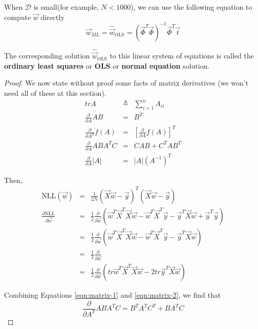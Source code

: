 When $\mathcal{D}$ is small(for example, $N < 1000$), we can use the following equation to compute $\vec{w}$ directly
\begin{equation}
\vec{w}_{ML}=\hat{\vec{w}}_{\mathrm{OLS}}=(\vec{\Phi}^T\vec{\Phi})^{-1}\vec{\Phi}^T\vec{t}
\end{equation}

The corresponding solution $\hat{\vec{w}}_{\mathrm{OLS}}$ to this linear system of equations is called the \textbf{ordinary least squares} or \textbf{OLS} or \textbf{normal equation} solution.

\begin{proof}
We now state without proof some facts of matrix derivatives (we won’t need all of these at this section).
\begin{eqnarray}
trA &\triangleq& \sum\limits_{i=1}^n A_{ii} \nonumber \\
\frac{\partial}{\partial A}AB &=& B^T \\
\frac{\partial}{\partial A^T}f(A) &=& \left[\frac{\partial}{\partial A}f(A)\right]^T \label{eqn:matrix-1} \\
\frac{\partial}{\partial A}ABA^TC &=& CAB+C^TAB^T \label{eqn:matrix-2} \\
\frac{\partial}{\partial A}|A| &=& |A|(A^{-1})^T
\end{eqnarray}

Then,
\begin{eqnarray*}
\text{NLL}(\vec{w}) &=& \frac{1}{2N}(\vec{X}\vec{w}-\vec{y})^T(\vec{X}\vec{w}-\vec{y}) \\
\frac{\partial \text{NLL}}{\partial\vec{w}} 
&=& \frac{1}{2} \frac{\partial}{\partial\vec{w}} (\vec{w}^T\vec{X}^T\vec{X}\vec{w}-\vec{w}^T\vec{X}^T\vec{y}-\vec{y}^T\vec{X}\vec{w}+\vec{y}^T\vec{y}) \\
&=& \frac{1}{2} \frac{\partial}{\partial\vec{w}} (\vec{w}^T\vec{X}^T\vec{X}\vec{w}-\vec{w}^T\vec{X}^T\vec{y}-\vec{y}^T\vec{X}\vec{w}) \\
&=& \frac{1}{2} \frac{\partial}{\partial\vec{w}}  \\
&=& \frac{1}{2} \frac{\partial}{\partial\vec{w}} (tr\vec{w}^T\vec{X}^T\vec{X}\vec{w}-2tr\vec{y}^T\vec{X}\vec{w})
\end{eqnarray*}

Combining Equations \ref{eqn:matrix-1} and \ref{eqn:matrix-2}, we find that 
\begin{equation*}
\frac{\partial}{\partial A^T}ABA^TC = B^TA^TC^T+BA^TC
\end{equation*}


\end{proof}
